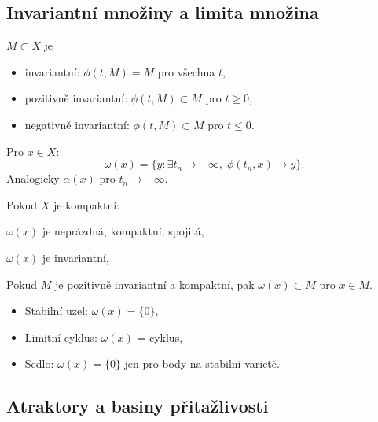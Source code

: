 \spc

\subsection{Invariantní množiny a limita množina}
\label{sec:invariantni-mnoziny}

\begin{definition}
$M\subset X$ je
\begin{itemize}
\item invariantní: $\phi(t,M)=M$ pro všechna $t$,
\item pozitivně invariantní: $\phi(t,M)\subset M$ pro $t\ge0$,
\item negativně invariantní: $\phi(t,M)\subset M$ pro $t\le0$.
\end{itemize}
\end{definition}

\begin{definition}
Pro $x\in X$:
\[
\omega(x)=\{y:\exists t_n\to+\infty,\;\phi(t_n,x)\to y\}.
\]
Analogicky $\alpha(x)$ pro $t_n\to-\infty$.
\end{definition}

\begin{theorem}
Pokud $X$ je kompaktní:
\begin{romanenum}
\item $\omega(x)$ je neprázdná, kompaktní, spojitá,
\item $\omega(x)$ je invariantní,
\item Pokud $M$ je pozitivně invariantní a kompaktní, pak $\omega(x)\subset M$ pro $x\in M$.
\end{romanenum}
\end{theorem}

\begin{example}
\begin{itemize}
\item Stabilní uzel: $\omega(x)=\{0\}$,
\item Limitní cyklus: $\omega(x)$ = cyklus,
\item Sedlo: $\omega(x)=\{0\}$ jen pro body na stabilní varietě.
\end{itemize}
\end{example}

\spc

\subsection{Atraktory a basiny přitažlivosti}
\label{sec:atraktory}

